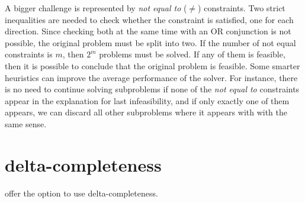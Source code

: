 \documentclass[runningheads]{llncs}
\begin{document}
A bigger challenge is represented by \textit{not equal to} ($\ne$) constraints.
Two strict inequalities are needed to check whether the constraint is satisfied, one for each direction.
Since checking both at the same time with an OR conjunction is not possible, the original problem must be split into two.
If the number of not equal constraints is $m$, then $2^m$ problems must be solved.
If any of them is feasible, then it is possible to conclude that the original problem is feasible.
Some smarter heuristics can improve the average performance of the solver.
For instance, there is no need to continue solving subproblems if none of the \textit{not equal to} constraints appear in the explanation for last infeasibility, and if only exactly one of them appears, we can discard all other subproblems where it appears with with the same sense.

\section{delta-completeness}

\dlinear offer the option to use delta-completeness.
\end{document}
